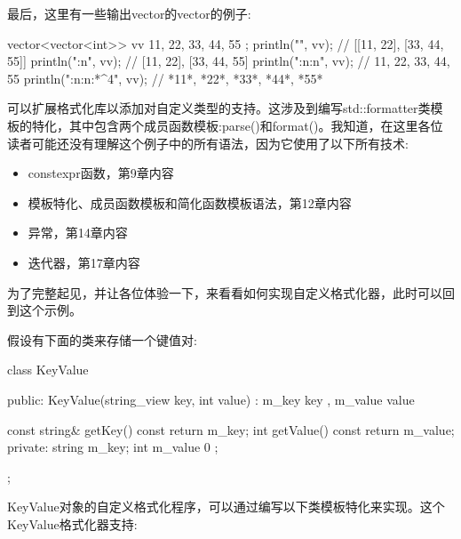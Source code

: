 最后，这里有一些输出vector的vector的例子:

\begin{cpp}
vector<vector<int>> vv { {11, 22}, {33, 44, 55} };
println("{}", vv);          // [[11, 22], [33, 44, 55]]
println("{:n}", vv);        // [11, 22], [33, 44, 55]
println("{:n:n}", vv);      // 11, 22, 33, 44, 55
println("{:n:n:*^4}", vv);  // *11*, *22*, *33*, *44*, *55*
\end{cpp}


可以扩展格式化库以添加对自定义类型的支持。这涉及到编写std::formatter类模板的特化，其中包含两个成员函数模板:parse()和format()。我知道，在这里各位读者可能还没有理解这个例子中的所有语法，因为它使用了以下所有技术:

\begin{itemize}
\item
constexpr函数，第9章内容

\item
模板特化、成员函数模板和简化函数模板语法，第12章内容

\item
异常，第14章内容

\item
迭代器，第17章内容
\end{itemize}

为了完整起见，并让各位体验一下，来看看如何实现自定义格式化器，此时可以回到这个示例。

假设有下面的类来存储一个键值对:

\begin{cpp}
class KeyValue
{
    public:
        KeyValue(string_view key, int value) : m_key { key }, m_value { value } {}

        const string& getKey() const { return m_key; }
        int getValue() const { return m_value; }
    private:
        string m_key;
        int m_value { 0 };
};
\end{cpp}

KeyValue对象的自定义格式化程序，可以通过编写以下类模板特化来实现。这个KeyValue格式化器支持:

